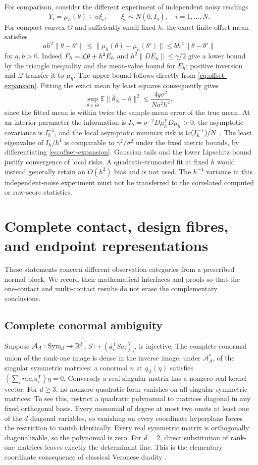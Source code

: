 For comparison, consider the different experiment of independent noisy readings
\[
 Y_i=\mu_h(\theta)+\sigma\xi_i,\qquad\xi_i\sim N(0,I_q),\quad i=1,\ldots,N.
\]
For compact convex $\Theta$ and sufficiently small fixed $h$, the exact finite-offset mean satisfies
\[
 ah^2\|\theta-\theta'\|\le\|\mu_h(\theta)-\mu_h(\theta')\|
                         \le bh^2\|\theta-\theta'\|
\]
for $a,b>0$. Indeed $F_h=\mathcal L\theta+h^2E_h$ and $h^2\|DE_h\|\le\gamma/2$ give a lower bound by the triangle inequality and the mean-value bound for $E_h$; positive inversion and $\mathcal Q$ transfer it to $\mu_h$. The upper bound follows directly from \eqref{eq:offset-expansion}. Fitting the exact mean by least squares consequently gives
\[
 \sup_{\theta\in\Theta}\mathbb E\|\widehat\theta_N-\theta\|^2
              \le\frac{4q\sigma^2}{Na^2h^4},
\]
since the fitted mean is within twice the sample-mean error of the true mean. At an interior parameter the information is $I_h=\sigma^{-2}D\mu_h^{\mathsf T}D\mu_h>0$, the asymptotic covariance is $I_h^{-1}$, and the local asymptotic minimax risk is $\operatorname{tr}(I_h^{-1})/N$ \cite{vdV}. The least eigenvalue of $I_h/h^4$ is comparable to $\gamma^2/\sigma^2$ under the fixed metric bounds, by differentiating \eqref{eq:offset-expansion}. Gaussian tails and the lower Lipschitz bound justify convergence of local risks. A quadratic-truncated fit at fixed $h$ would instead generally retain an $O(h^2)$ bias and is not used. The $h^{-4}$ variance in this independent-noise experiment must not be transferred to the correlated computed or raw-score statistics.

\section{Complete contact, design fibres, and endpoint representations}\label{app:complementary}
These statements concern different observation categories from a prescribed normal block. We record their mathematical interfaces and proofs so that the one-contact and multi-contact results do not erase the complementary conclusions.

\subsection{Complete conormal ambiguity}
Suppose $\mathcal A_A:\operatorname{Sym}_d\to\mathbb R^k$, $S\mapsto(a_i^{\mathsf T}Sa_i)_i$, is injective. The complete conormal union of the rank-one image is dense in the inverse image, under $\mathcal A_A^*$, of the singular symmetric matrices: a conormal $n$ at $q_A(\eta)$ satisfies $(\sum_i n_i a_ia_i^{\mathsf T})\eta=0$. Conversely a real singular matrix has a nonzero real kernel vector. For $d\ge3$, no nonzero quadratic form vanishes on all singular symmetric matrices. To see this, restrict a quadratic polynomial to matrices diagonal in any fixed orthogonal basis. Every monomial of degree at most two omits at least one of the $d$ diagonal variables, so vanishing on every coordinate hyperplane forces the restriction to vanish identically. Every real symmetric matrix is orthogonally diagonalizable, so the polynomial is zero. For $d=2$, direct substitution of rank-one matrices leaves exactly the determinant line. This is the elementary coordinate consequence of classical Veronese duality \cite{GKZ}.

